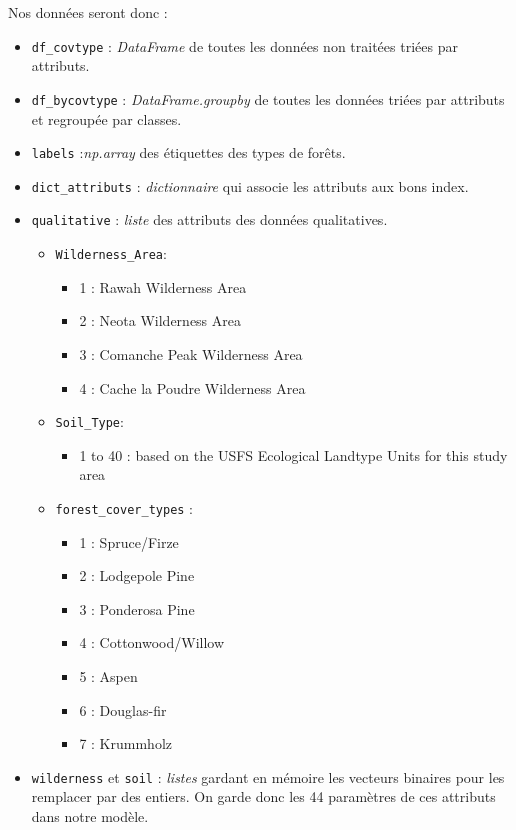 \documentclass[12pt,a4paper]{article}
\numberwithin{equation}{section}
\newcommand{\wilderness}{\texttt{Wilderness\_Area}}
\newcommand{\soil}{\texttt{Soil\_Type}}
\begin{document}
	Nos données seront donc : 
	\begin{itemize}
	 	\item \verb!df_covtype! : \textit{DataFrame} de toutes les données non traitées triées par attributs. 
	 	\item \verb!df_bycovtype! : \textit{DataFrame.groupby} de toutes les données triées par attributs et regroupée par classes. 
	 	\item \verb!labels! :\textit{np.array} des étiquettes des types de forêts.
	 	\item \verb!dict_attributs! : \textit{dictionnaire} qui associe les attributs aux bons index. 
	 	\item \verb!qualitative! : \textit{liste} des attributs des données qualitatives.
	 	
	 	\begin{itemize}
	 		\item \wilderness :
	 	
		 		\begin{itemize}
		 				\item 1 : Rawah Wilderness Area
		 				\item 2 : Neota Wilderness Area
		 				\item 3 : Comanche Peak Wilderness Area
		 				\item 4 : Cache la Poudre Wilderness Area
		 		\end{itemize}
		 	
		 	\item \soil :
		 	\begin{itemize}
		 		\item 1 to 40 : based on the USFS Ecological Landtype Units for this study area
		 	\end{itemize}
	 	
	 		\item \verb!forest_cover_types! : 
	 			\begin{itemize}
	 					\item 1 : Spruce/Firze
 						\item 2 : Lodgepole Pine
 						\item 3 : Ponderosa Pine
 						\item 4 : Cottonwood/Willow
 						\item 5 : Aspen
 						\item 6 : Douglas-fir
 						\item 7 : Krummholz
		\end{itemize}
	\end{itemize}
	
	\item \verb!wilderness! et \verb!soil! : \textit{listes} gardant en mémoire les vecteurs binaires pour les remplacer par des entiers. On garde donc les 44 paramètres de ces attributs dans notre modèle.
	
	\end{itemize}
	
\end{document}
